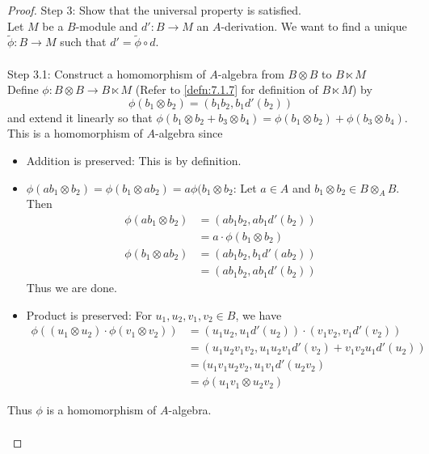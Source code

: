 \documentclass[a4paper]{article}
\begin{document}
\begin{prp}{}{}
\begin{proof}
Step 3: Show that the universal property is satisfied. \\
Let $M$ be a $B$-module and $d':B\to M$ an $A$-derivation. We want to find a unique $\tilde{\phi}:B\to M$ such that $d'=\tilde{\phi}\circ d$. \\~\\

Step 3.1: Construct a homomorphism of $A$-algebra from $B\otimes B$ to $B\ltimes M$ \\
Define $\phi:B\otimes B\to B\ltimes M$ (Refer to \ref{defn:7.1.7} for definition of $B\ltimes M$) by $$\phi(b_1\otimes b_2)=(b_1b_2,b_1d'(b_2))$$ and extend it linearly so that $\phi(b_1\otimes b_2+b_3\otimes b_4)=\phi(b_1\otimes b_2)+\phi(b_3\otimes b_4)$. This is a homomorphism of $A$-algebra since 
\begin{itemize}
\item Addition is preserved: This is by definition. 
\item $\phi(ab_1\otimes b_2)=\phi(b_1\otimes ab_2)=a\phi(b_1\otimes b_2$: Let $a\in A$ and $b_1\otimes b_2\in B\otimes_A B$. Then 
\begin{align*}
\phi(ab_1\otimes b_2)&=(ab_1b_2,ab_1d'(b_2))\\
&=a\cdot\phi(b_1\otimes b_2)\\
\phi(b_1\otimes ab_2)&=(ab_1b_2,b_1d'(ab_2))\\
&=(ab_1b_2,ab_1d'(b_2))
\end{align*}
Thus we are done. 
\item Product is preserved: For $u_1,u_2,v_1,v_2\in B$, we have
\begin{align*}
\phi((u_1\otimes u_2)\cdot\phi(v_1\otimes v_2))&=(u_1u_2,u_1d'(u_2))\cdot(v_1v_2,v_1d'(v_2))\\
&=(u_1u_2v_1v_2,u_1u_2v_1d'(v_2)+v_1v_2u_1d'(u_2))\\
&=(u_1v_1u_2v_2,u_1v_1d'(u_2v_2)\\
&=\phi(u_1v_1\otimes u_2v_2)
\end{align*}
\end{itemize}
Thus $\phi$ is a homomorphism of $A$-algebra. \\~\\


\end{proof}
\end{prp}
\end{document}
